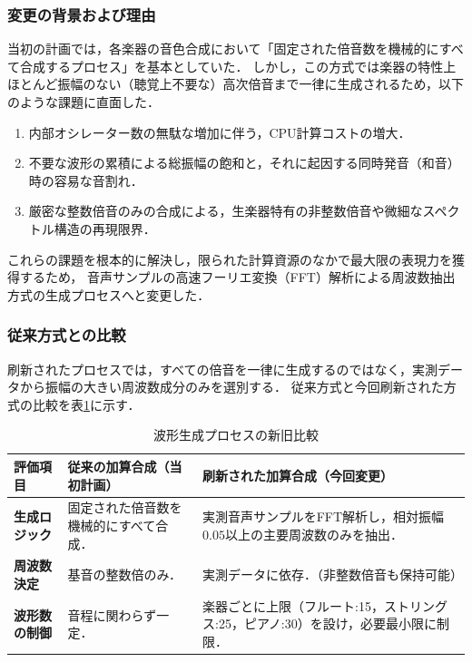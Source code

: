 \documentclass[lualatex,book,paper=a4paper,jafontsize=11.5pt,jafontscale=1.05]{jlreq}
\begin{document}
\subsubsection{変更の背景および理由}
当初の計画では，各楽器の音色合成において「固定された倍音数を機械的にすべて合成するプロセス」を基本としていた．
しかし，この方式では楽器の特性上ほとんど振幅のない（聴覚上不要な）高次倍音まで一律に生成されるため，以下のような課題に直面した．
\begin{enumerate}
    \item 内部オシレーター数の無駄な増加に伴う，CPU計算コストの増大．
    \item 不要な波形の累積による総振幅の飽和と，それに起因する同時発音（和音）時の容易な音割れ．
    \item 厳密な整数倍音のみの合成による，生楽器特有の非整数倍音や微細なスペクトル構造の再現限界．
\end{enumerate}
これらの課題を根本的に解決し，限られた計算資源のなかで最大限の表現力を獲得するため，
音声サンプルの高速フーリエ変換（FFT）解析\cite{FFT}による周波数抽出方式の生成プロセスへと変更した．

\subsubsection{従来方式との比較}
刷新されたプロセスでは，すべての倍音を一律に生成するのではなく，実測データから振幅の大きい周波数成分のみを選別する．
従来方式と今回刷新された方式の比較を表\ref{table:ProcessChanged}に示す．
\begin{table}[H]
    \centering
    \caption{波形生成プロセスの新旧比較}
    \label{table:ProcessChanged}
    \begin{tabular}{p{3cm}p{6cm}p{6.5cm}}
        \hline
        \textbf{評価項目} & \textbf{従来の加算合成（当初計画）} & \textbf{刷新された加算合成（今回変更）} \\ \hline
        \textbf{生成ロジック} & 固定された倍音数を機械的にすべて合成． & 実測音声サンプルをFFT解析し，相対振幅$0.05$以上の主要周波数のみを抽出． \\ \hline
        \textbf{周波数決定} & 基音の整数倍のみ． & 実測データに依存．（非整数倍音も保持可能） \\ \hline
        \textbf{波形数の制御} & 音程に関わらず一定． & 楽器ごとに上限（フルート:15，ストリングス:25，ピアノ:30）を設け，必要最小限に制限． \\ \hline
    \end{tabular}
\end{table}
\end{document}
